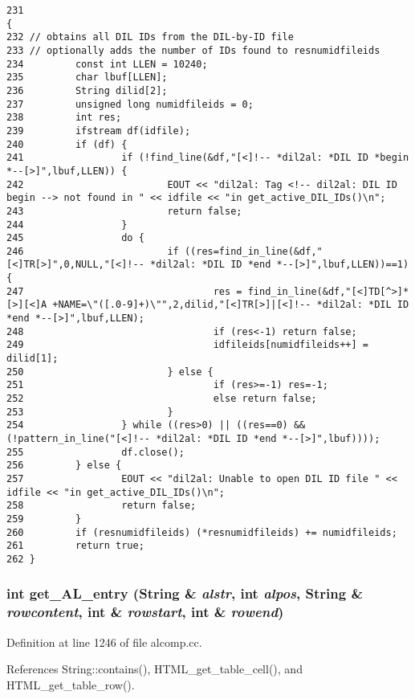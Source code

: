 \footnotesize\begin{verbatim}231                                                                                         {
232 // obtains all DIL IDs from the DIL-by-ID file
233 // optionally adds the number of IDs found to resnumidfileids
234         const int LLEN = 10240;
235         char lbuf[LLEN];
236         String dilid[2];
237         unsigned long numidfileids = 0;
238         int res;
239         ifstream df(idfile);
240         if (df) {
241                 if (!find_line(&df,"[<]!-- *dil2al: *DIL ID *begin *--[>]",lbuf,LLEN)) {
242                         EOUT << "dil2al: Tag <!-- dil2al: DIL ID begin --> not found in " << idfile << "in get_active_DIL_IDs()\n";
243                         return false;
244                 }
245                 do {
246                         if ((res=find_in_line(&df,"[<]TR[>]",0,NULL,"[<]!-- *dil2al: *DIL ID *end *--[>]",lbuf,LLEN))==1) {
247                                 res = find_in_line(&df,"[<]TD[^>]*[>][<]A +NAME=\"([.0-9]+)\"",2,dilid,"[<]TR[>]|[<]!-- *dil2al: *DIL ID *end *--[>]",lbuf,LLEN);
248                                 if (res<-1) return false;
249                                 idfileids[numidfileids++] = dilid[1];
250                         } else {
251                                 if (res>=-1) res=-1;
252                                 else return false;
253                         }
254                 } while ((res>0) || ((res==0) && (!pattern_in_line("[<]!-- *dil2al: *DIL ID *end *--[>]",lbuf))));
255                 df.close();
256         } else {
257                 EOUT << "dil2al: Unable to open DIL ID file " << idfile << "in get_active_DIL_IDs()\n";
258                 return false;
259         }
260         if (resnumidfileids) (*resnumidfileids) += numidfileids;
261         return true;
262 }
\end{verbatim}\normalsize 
{}
\subsubsection{\setlength{\rightskip}{0pt plus 5cm}int get\_\-AL\_\-entry ({\bf String} \& {\em alstr}, int {\em alpos}, {\bf String} \& {\em rowcontent}, int \& {\em rowstart}, int \& {\em rowend})}\label{dil2al_8hh_a293}




Definition at line 1246 of file alcomp.cc.

References String::contains(), HTML\_\-get\_\-table\_\-cell(), and HTML\_\-get\_\-table\_\-row().

